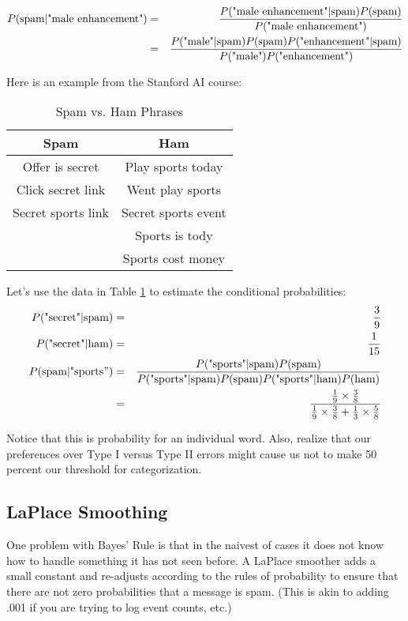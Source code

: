 \documentclass[12pt,letter]{article}
\begin{document}
\begin{eqnarray*}
P(\text{spam}|\text{"male enhancement"}) &=&
{{P(\text{"male enhancement"}|\text{spam})P(\text{spam})} \over
  P(\text{"male enhancement"})} \\
&=& {{P(\text{"male"}|\text{spam})P(\text{spam})P(\text{"enhancement"}|\text{spam})} \over
  P(\text{"male"}) P(\text{"enhancement"})} 
\end{eqnarray*}

Here is an example from the Stanford AI course:
\begin{table}[h!]
\caption{Spam vs. Ham Phrases}
\label{spam}
\centering
\begin{tabular}{c|c}
Spam & Ham \\
\hline
Offer is secret & Play sports today \\
Click secret link & Went play sports \\
Secret sports link & Secret sports event \\
& Sports is tody \\
& Sports cost money 
\end{tabular}
\end{table}

Let's use the data in Table \ref{spam} to estimate the conditional probabilities:
\begin{eqnarray*}
P(\text{"secret"|spam}) &=& \frac{3}{9} \\
P(\text{"secret"|ham}) &=& \frac{1}{15} \\
P(\text{spam|"sports}") &=& {
  P(\text{"sports"|spam}) P(\text{spam}) \over
  {P(\text{"sports"}|\text{spam})P(\text{spam})P(\text{"sports"}|\text{ham})
    P(\text{ham})}} \\
&=& {\frac{1}{9} \times \frac{3}{8}} \over {\frac{1}{9} \times
  \frac{3}{8} + \frac{1}{3} \times
  \frac{5}{8}}
\end{eqnarray*}

Notice that this is probability for an individual word. Also, realize
that our preferences over Type I versus Type II errors might cause us
not to make 50 percent our threshold for categorization. 



\subsection{LaPlace Smoothing}
One problem with Bayes' Rule is that in the naivest of cases it does
not know how to handle something it has not seen before. A LaPlace
smoother adds a small constant and re-adjusts according to the rules
of probability to ensure that there are not zero probabilities that a
message is spam. (This is akin to adding .001 if you are trying to log
event counts, etc.)
\end{document}
